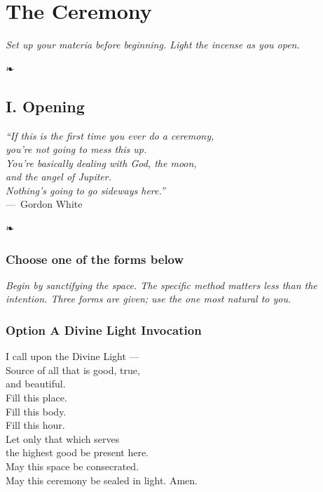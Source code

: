 \documentclass[10pt,openany]{book}
\newcommand{\prayersize}{\Large}
\newcommand{\rubricsize}{\large}
\newcommand{\rubric}[1]{%
  {\rubricsize\itshape\color{rubricsred} #1}%
}
\newcommand{\prayerblock}[1]{%
  {\linespread{1.2}\prayersize\noindent #1\par}%
}
\newcommand{\ornsep}{%
  \vspace{10pt}%
  \centerline{{\color{deepgold}\liturgicalfont ❧}}%
  \vspace{8pt}%
}
\begin{document}
\chapter*{The Ceremony}
\thispagestyle{fancy}

\rubric{Set up your materia before beginning. Light the incense as you open.}

\ornsep


\section*{I. Opening}

\vspace{6pt}
\begin{center}
  {\normalsize\itshape\color{darkgrey}
    ``If this is the first time you ever do a ceremony,\\
    you're not going to mess this up.\\
    You're basically dealing with God, the moon,\\
    and the angel of Jupiter.\\
    Nothing's going to go sideways here.''
  }\\[6pt]
  {\footnotesize\color{darkgrey} ---~Gordon White}
\end{center}

\ornsep

\subsection*{Choose one of the forms below}

\rubric{Begin by sanctifying the space. The specific method matters less than
the intention. Three forms are given; use the one most natural to you.}

\vspace{8pt}

\subsection*{Option A \hspace{0.5em} Divine Light Invocation}

\prayerblock{%
  I call upon the Divine Light ---\\
  Source of all that is good, true,\\
  and beautiful.\\[8pt]
  Fill this place.\\
  Fill this body.\\
  Fill this hour.\\[8pt]
  Let only that which serves\\
  the highest good be present here.\\[8pt]
  May this space be consecrated.\\
  May this ceremony be sealed in light. Amen.
}
\end{document}
